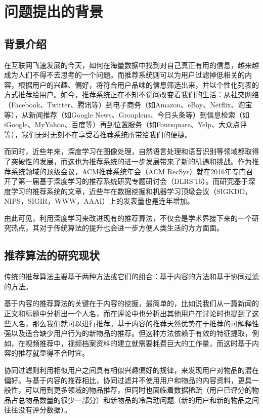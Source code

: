 
\centerline{\textbf{}}
\bigskip

\chapter{问题提出的背景}
\section{背景介绍}
在互联网飞速发展的今天，如何在海量数据中找到对自己真正有用的信息，越来越成为人们不得不去思考的一个问题。而推荐系统则可以为用户过滤掉低相关的内容，根据用户的兴趣、偏好，将符合用户品味的信息筛选出来，并以个性化列表的方式推荐给用户。如今，推荐系统正在不知不觉间改变着我们的生活：从社交网络（Facebook、Twitter、腾讯等）到电子商务（如Amazon、eBay、Netflix、淘宝等），从新闻推荐（如Google News、Grouplens、今日头条等）到信息检索（如iGoogle、MyYahoo、百度等）再到位置服务（如Foursquare、Yelp、大众点评等），我们无时无刻不在享受着推荐系统所带给我们的便捷。

而同时，近些年来，深度学习在图像处理，自然语言处理和语音识别等领域都取得了突破性的发展，而这也为推荐系统的进一步发展带来了新的机遇和挑战。作为推荐系统领域的顶级会议，ACM推荐系统年会（ACM RecSys）就在2016年专门召开了第一届基于深度学习的推荐系统研究专题研讨会（DLRS'16）。而研究基于深度学习的推荐系统的文章，近些年在数据挖掘和机器学习顶级会议（SIGKDD，NIPS，SIGIR，WWW，AAAI）上的发表量也是连年增加。

由此可见，利用深度学习来改进现有的推荐算法，不仅会是学术界接下来的一个研究热点，其对于传统算法的提升也会进一步方便人类生活的方方面面。
\section{推荐算法的研究现状}

传统的推荐算法主要基于两种方法或它们的组合：基于内容的方法和基于协同过滤的方法。

基于内容的推荐算法的关键在于内容的挖掘，最简单的，比如说我们从一篇新闻的正文和标题中分析出一个人名，而在评论中也分析出其他用户在讨论时也提到了这些人名，那么我们就可以进行推荐。基于内容的推荐天然优势在于推荐的可解释性强以及适合缺少用户行为的新物品的推荐。但这种方法依赖于有效的特征提取，例如，在视频推荐中\cite{Sarwar01item-basedcollaborative}，视频档案资料的建立就需要耗费巨大的工作量，而这时基于内容的推荐就显得不合时宜。

协同过滤则利用相似用户之间具有相似兴趣偏好的规律，来发现用户对物品的潜在偏好。与基于内容的推荐相比，协同过滤并不使用用户和物品的内容资料，更具一般性，可以用到更多领域的物品推荐，但同时也面临着数据稀疏（用户已评分的物品占总物品数量的很少一部分）和新物品的冷启动问题（新的用户和新的物品之间往往没有评分数据）。

